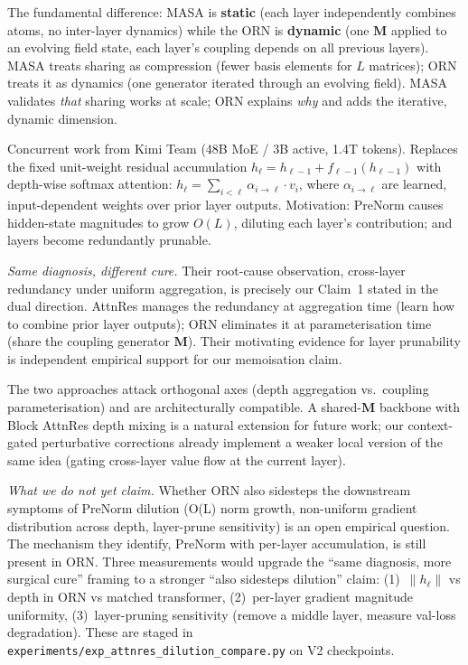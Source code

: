 \documentclass[11pt, a4paper]{article}
\newcommand{\M}{\mathbf{M}}
\theoremstyle{remark}
\begin{document}
\begin{description}[nosep, leftmargin=1.5em]
    The fundamental difference: MASA is \textbf{static} (each layer independently combines atoms, no inter-layer dynamics) while the ORN is \textbf{dynamic} (one $\M$ applied to an evolving field state, each layer's coupling depends on all previous layers).
    MASA treats sharing as compression (fewer basis elements for $L$ matrices); ORN treats it as dynamics (one generator iterated through an evolving field).
    MASA validates \emph{that} sharing works at scale; ORN explains \emph{why} and adds the iterative, dynamic dimension.

    \item[Attention Residuals~\cite{kimi2026attnres} (March 2026):]
    Concurrent work from Kimi Team (48B MoE / 3B active, 1.4T tokens).
    Replaces the fixed unit-weight residual accumulation $h_\ell = h_{\ell-1} + f_{\ell-1}(h_{\ell-1})$ with depth-wise softmax attention: $h_\ell = \sum_{i<\ell} \alpha_{i \to \ell} \cdot v_i$, where $\alpha_{i \to \ell}$ are learned, input-dependent weights over prior layer outputs.
    Motivation: PreNorm causes hidden-state magnitudes to grow $O(L)$, diluting each layer's contribution; and layers become redundantly prunable.

    \emph{Same diagnosis, different cure.}
    Their root-cause observation, cross-layer redundancy under uniform aggregation, is precisely our Claim~1 stated in the dual direction.
    AttnRes manages the redundancy at aggregation time (learn how to combine prior layer outputs); ORN eliminates it at parameterisation time (share the coupling generator $\M$).
    Their motivating evidence for layer prunability is independent empirical support for our memoisation claim.

    The two approaches attack orthogonal axes (depth aggregation vs.\ coupling parameterisation) and are architecturally compatible.
    A shared-$\M$ backbone with Block AttnRes depth mixing is a natural extension for future work; our context-gated perturbative corrections already implement a weaker local version of the same idea (gating cross-layer value flow at the current layer).

    \emph{What we do not yet claim.}
    Whether ORN also sidesteps the downstream symptoms of PreNorm dilution (O(L) norm growth, non-uniform gradient distribution across depth, layer-prune sensitivity) is an open empirical question.
    The mechanism they identify, PreNorm with per-layer accumulation, is still present in ORN.
    Three measurements would upgrade the ``same diagnosis, more surgical cure'' framing to a stronger ``also sidesteps dilution'' claim: (1)~$\|h_\ell\|$ vs depth in ORN vs matched transformer, (2)~per-layer gradient magnitude uniformity, (3)~layer-pruning sensitivity (remove a middle layer, measure val-loss degradation).
    These are staged in \texttt{experiments/exp\_attnres\_dilution\_compare.py} on V2 checkpoints.


\end{description}
\end{document}
